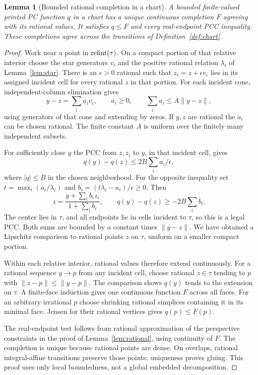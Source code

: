 \documentclass[11pt]{article}
\newtheorem{lemma}[theorem]{Lemma}
\theoremstyle{definition}\newtheorem{definition}[theorem]{Definition}
\theoremstyle{remark}\newtheorem{remark}[theorem]{Remark}
\begin{document}
\begin{lemma}[Bounded rational completion in a chart]\label{lem:completion}
A bounded finite-valued printed PC function $q$ in a chart has a unique continuous completion $F$ agreeing with its rational values. It satisfies $q\leq F$ and every real-endpoint PCC inequality. These completions agree across the transitions of Definition~\ref{def:chart}.
\end{lemma}
\begin{proof}
Work near a point in $\operatorname{relint}(\tau)$. On a compact portion of that relative interior choose the star generators $v_i$ and the positive rational relation $\lambda_i$ of Lemma~\ref{lem:star}. There is an $\epsilon>0$ rational such that $z_i=z+\epsilon v_i$ lies in its assigned incident cell for every rational $z$ in that portion. For each incident cone, independent-column elimination gives
\[
 y-z=\sum_i a_i v_i,\qquad a_i\geq0,\qquad \sum_i a_i\leq A\|y-z\|,
\]
using generators of that cone and extending by zeros. If $y,z$ are rational the $a_i$ can be chosen rational. The finite constant $A$ is uniform over the finitely many independent subsets.

For sufficiently close $y$ the PCC from $z,z_i$ to $y$, in that incident cell, gives
\[
 q(y)-q(z)\leq 2B\sum_i a_i/\epsilon,
\]
where $|q|\leq B$ in the chosen neighborhood. For the opposite inequality set $t=\max_i(a_i/\lambda_i)$ and $b_i=(t\lambda_i-a_i)/\epsilon\geq0$. Then
\[
 z=\frac{y+\sum_i b_i z_i}{1+\sum_i b_i},\qquad
 q(y)-q(z)\geq-2B\sum_i b_i.
\]
The center lies in $\tau$, and all endpoints lie in cells incident to $\tau$, so this is a legal PCC. Both sums are bounded by a constant times $\|y-z\|$. We have obtained a Lipschitz comparison to rational points $z$ on $\tau$, uniform on a smaller compact portion.

Within each relative interior, rational values therefore extend continuously. For a rational sequence $y\to p$ from any incident cell, choose rational $z\in\tau$ tending to $p$ with $\|z-p\|\leq\|y-p\|$. The comparison shows $q(y)$ tends to the extension on $\tau$. A finite-face induction gives one continuous function $F$ across all faces. For an arbitrary irrational $p$ choose shrinking rational simplices containing it in its minimal face. Jensen for their rational vertices gives $q(p)\leq F(p)$.

The real-endpoint test follows from rational approximation of the perspective constraints in the proof of Lemma~\ref{lem:rational}, using continuity of $F$. The completion is unique because rational points are dense. On overlaps, rational integral-affine transitions preserve those points; uniqueness proves gluing. This proof uses only local boundedness, not a global embedded decomposition.
\end{proof}
\end{document}
